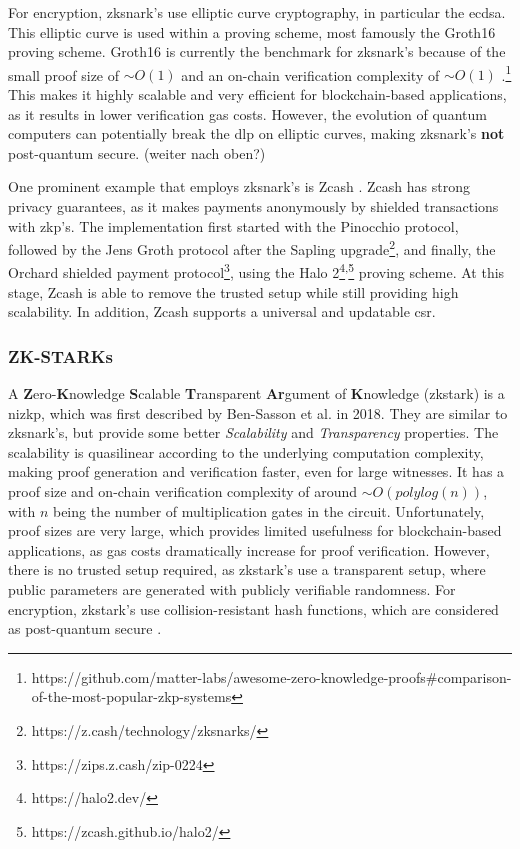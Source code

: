 For encryption, \acrshort{zksnark}'s use elliptic curve cryptography, in particular the \acrfull{ecdsa}. This elliptic curve is used within a proving scheme, most famously the Groth16 \cite{grothSizePairingBasedNoninteractive2016} proving scheme. Groth16 is currently the benchmark for \acrshort{zksnark}'s because of the small proof size of $\sim O(1)$ and an on-chain verification complexity of $\sim O(1)$ \cite{sallerasZPiEZeroKnowledgeProofs2021}.\footnote{\label{gh_zkp}https://github.com/matter-labs/awesome-zero-knowledge-proofs\#comparison-of-the-most-popular-zkp-systems} This makes it highly scalable and very efficient for blockchain-based applications, as it results in lower verification gas costs. However, the evolution of quantum computers can potentially break the \acrfull{dlp} on elliptic curves, making \acrshort{zksnark}'s \textbf{not} post-quantum secure. (weiter nach oben?)

One prominent example that employs \acrshort{zksnark}'s is Zcash \cite{bensassonZerocashDecentralizedAnonymous2014}. Zcash has strong privacy guarantees, as it makes payments anonymously by shielded transactions with \acrshort{zkp}'s. The implementation first started with the Pinocchio \cite{parnoPinocchioNearlyPractical} protocol, followed by the Jens Groth \cite{grothSizePairingBasedNoninteractive2016} protocol after the Sapling upgrade\footnote{https://z.cash/technology/zksnarks/}, and finally, the Orchard shielded payment protocol\footnote{https://zips.z.cash/zip-0224}, using the Halo 2{\footnote{https://halo2.dev/}\textsuperscript{,}\footnote{https://zcash.github.io/halo2/}} proving scheme. At this stage, Zcash is able to remove the trusted setup while still providing high scalability. In addition, Zcash supports a universal and updatable \acrshort{csr}.

\subsubsection{ZK-STARKs}
\label{subsubsec:zkstarks}

A \textbf{Z}ero-\textbf{K}nowledge \textbf{S}calable \textbf{T}ransparent \textbf{Ar}gument of \textbf{K}nowledge (\acrshort{zkstark}) is a \acrshort{nizkp}, which was first described by Ben-Sasson et al. \cite{ben-sassonScalableTransparentPostquantum} in 2018. They are similar to \acrshort{zksnark}'s, but provide some better \emph{Scalability} and \emph{Transparency} properties. The scalability is quasilinear according to the underlying computation complexity, making proof generation and verification faster, even for large witnesses. It has a proof size and on-chain verification complexity of around $\sim O(polylog(n))$, with $n$ being the number of multiplication gates in the circuit. Unfortunately, proof sizes are very large, which provides limited usefulness for blockchain-based applications, as gas costs dramatically increase for proof verification. However, there is no trusted setup required, as \acrshort{zkstark}'s use a transparent setup, where public parameters are generated with publicly verifiable randomness. For encryption, \acrshort{zkstark}'s use collision-resistant hash functions, which are considered as post-quantum secure \cite{QuantumsafeCryptographyFundamentals}.

